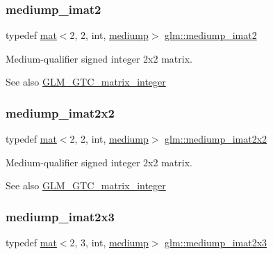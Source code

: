 \subsubsection{\texorpdfstring{mediump\+\_\+imat2}{mediump\_imat2}}
{\footnotesize\ttfamily typedef \hyperlink{structglm_1_1mat}{mat}$<$2, 2, int, \hyperlink{namespaceglm_a36ed105b07c7746804d7fdc7cc90ff25a6416f3ea0c9025fb21ed50c4d6620482}{mediump}$>$ \hyperlink{group__gtc__matrix__integer_ga74e065ab9524e6b7bd5a84cffb758e71}{glm\+::mediump\+\_\+imat2}}

Medium-\/qualifier signed integer 2x2 matrix. \begin{DoxySeeAlso}{See also}
\hyperlink{group__gtc__matrix__integer}{G\+L\+M\+\_\+\+G\+T\+C\+\_\+matrix\+\_\+integer} 
\end{DoxySeeAlso}
\mbox{\label{group__gtc__matrix__integer_gafe326375aa42c0abbe571d376f4cbd95}} 
\subsubsection{\texorpdfstring{mediump\+\_\+imat2x2}{mediump\_imat2x2}}
{\footnotesize\ttfamily typedef \hyperlink{structglm_1_1mat}{mat}$<$2, 2, int, \hyperlink{namespaceglm_a36ed105b07c7746804d7fdc7cc90ff25a6416f3ea0c9025fb21ed50c4d6620482}{mediump}$>$ \hyperlink{group__gtc__matrix__integer_gafe326375aa42c0abbe571d376f4cbd95}{glm\+::mediump\+\_\+imat2x2}}

Medium-\/qualifier signed integer 2x2 matrix. \begin{DoxySeeAlso}{See also}
\hyperlink{group__gtc__matrix__integer}{G\+L\+M\+\_\+\+G\+T\+C\+\_\+matrix\+\_\+integer} 
\end{DoxySeeAlso}
\mbox{\label{group__gtc__matrix__integer_ga1e2d944bde5dfe9fe49824c4c3457e30}} 
\subsubsection{\texorpdfstring{mediump\+\_\+imat2x3}{mediump\_imat2x3}}
{\footnotesize\ttfamily typedef \hyperlink{structglm_1_1mat}{mat}$<$2, 3, int, \hyperlink{namespaceglm_a36ed105b07c7746804d7fdc7cc90ff25a6416f3ea0c9025fb21ed50c4d6620482}{mediump}$>$ \hyperlink{group__gtc__matrix__integer_ga1e2d944bde5dfe9fe49824c4c3457e30}{glm\+::mediump\+\_\+imat2x3}}

